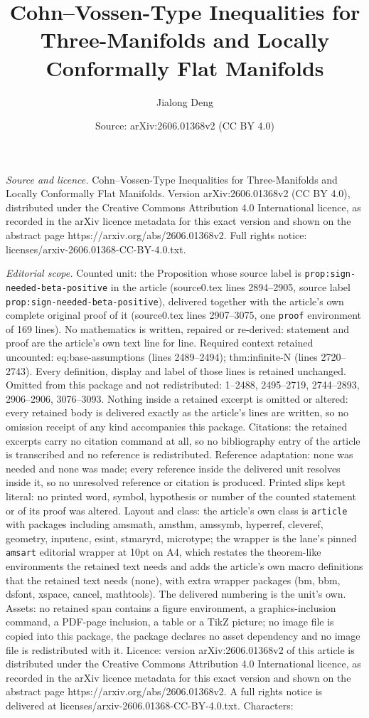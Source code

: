 \documentclass[10pt,a4paper]{amsart}
\title[Cohn--Vossen-Type Inequalities for Three-Manifolds and Local]{Cohn--Vossen-Type Inequalities for Three-Manifolds and Locally Conformally Flat Manifolds}
\author{Jialong Deng}
\date{Source: arXiv:2606.01368v2 (CC BY 4.0)}
\begin{document}
\maketitle

\noindent\emph{Source and licence.} Cohn--Vossen-Type Inequalities for Three-Manifolds and Locally Conformally Flat Manifolds. Version arXiv:2606.01368v2 (CC BY 4.0), distributed under the Creative Commons Attribution 4.0 International licence, as recorded in the arXiv licence metadata for this exact version and shown on the abstract page https://arxiv.org/abs/2606.01368v2. Full rights notice: licenses/arxiv-2606.01368-CC-BY-4.0.txt.\par\smallskip

\noindent\textit{Editorial scope.} Counted unit: the Proposition whose source label is \texttt{prop:sign-needed-beta-positive} in the article (source0.tex lines 2894--2905, source label \texttt{prop:sign-needed-beta-positive}), delivered together with the article's own complete original proof of it (source0.tex lines 2907--3075, one \texttt{proof} environment of 169 lines). No mathematics is written, repaired or re-derived: statement and proof are the article's own text line for line. Required context retained uncounted: eq:base-assumptions (lines 2489--2494); thm:infinite-N (lines 2720--2743). Every definition, display and label of those lines is retained unchanged. Omitted from this package and not redistributed: 1--2488, 2495--2719, 2744--2893, 2906--2906, 3076--3093. Nothing inside a retained excerpt is omitted or altered: every retained body is delivered exactly as the article's lines are written, so no omission receipt of any kind accompanies this package. Citations: the retained excerpts carry no citation command at all, so no bibliography entry of the article is transcribed and no reference is redistributed. Reference adaptation: none was needed and none was made; every reference inside the delivered unit resolves inside it, so no unresolved reference or citation is produced. Printed slips kept literal: no printed word, symbol, hypothesis or number of the counted statement or of its proof was altered. Layout and class: the article's own class is \texttt{article} with packages including amsmath, amsthm, amssymb, hyperref, cleveref, geometry, inputenc, esint, stmaryrd, microtype; the wrapper is the lane's pinned \texttt{amsart} editorial wrapper at 10pt on A4, which restates the theorem-like environments the retained text needs and adds the article's own macro definitions that the retained text needs (none), with extra wrapper packages (bm, bbm, dsfont, xspace, cancel, mathtools). The delivered numbering is the unit's own. Assets: no retained span contains a figure environment, a graphics-inclusion command, a PDF-page inclusion, a table or a TikZ picture; no image file is copied into this package, the package declares no asset dependency and no image file is redistributed with it. Licence: version arXiv:2606.01368v2 of this article is distributed under the Creative Commons Attribution 4.0 International licence, as recorded in the arXiv licence metadata for this exact version and shown on the abstract page https://arxiv.org/abs/2606.01368v2. A full rights notice is delivered at licenses/arxiv-2606.01368-CC-BY-4.0.txt. Characters: 
\end{document}
